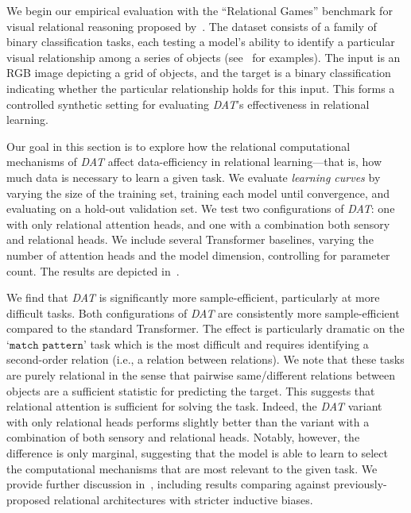 We begin our empirical evaluation with the ``Relational Games'' benchmark for visual relational reasoning proposed by~\citet{shanahanExplicitlyRelationalNeurala}. The dataset consists of a family of binary classification tasks, each testing a model's ability to identify a particular visual relationship among a series of objects (see~ for examples). The input is an RGB image depicting a grid of objects, and the target is a binary classification indicating whether the particular relationship holds for this input. This forms a controlled synthetic setting for evaluating \textit{DAT}'s effectiveness in relational learning.

Our goal in this section is to explore how the relational computational mechanisms of \textit{DAT} affect data-efficiency in relational learning---that is, how much data is necessary to learn a given task. We evaluate \textit{learning curves} by varying the size of the training set, training each model until convergence, and evaluating on a hold-out validation set. We test two configurations of \textit{DAT}: one with only relational attention heads, and one with a combination both sensory and relational heads. We include several Transformer baselines, varying the number of attention heads and the model dimension, controlling for parameter count.
The results are depicted in~.

We find that \textit{DAT} is significantly more sample-efficient, particularly at more difficult tasks. Both configurations of \textit{DAT} are consistently more sample-efficient compared to the standard Transformer. The effect is particularly dramatic on the `$\mathtt{match\,\,pattern}$' task which is the most difficult and requires identifying a second-order relation (i.e., a relation between relations). We note that these tasks are purely relational in the sense that pairwise same/different relations between objects are a sufficient statistic for predicting the target. This suggests that relational attention is sufficient for solving the task. Indeed, the \textit{DAT} variant with only relational heads performs slightly better than the variant with a combination of both sensory and relational heads. Notably, however, the difference is only marginal, suggesting that the model is able to learn to select the computational mechanisms that are most relevant to the given task. We provide further discussion in~, including results comparing against previously-proposed relational architectures with stricter inductive biases.


